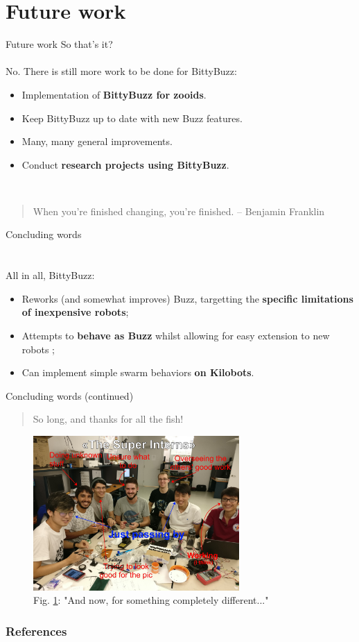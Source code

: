 \documentclass{beamer}
\begin{document}
	\section{Future work}
	\begin{frame}{Future work}
		So that's it?\\
		~\\
		No. There is still more work to be done for BittyBuzz:
		\begin{itemize}
			\item Implementation of \textbf{BittyBuzz for zooids}.
			\item Keep BittyBuzz up to date with new Buzz features.
			\item Many, many general improvements.
			\item Conduct \textbf{research projects using BittyBuzz}.
		\end{itemize}
		~\\
		\begin{quote}
			When you're finished changing, you're finished. -- Benjamin Franklin
		\end{quote}
	\end{frame}
	\begin{frame}{Concluding words}
		\section{}
		All in all, BittyBuzz:
		\begin{itemize}
			\item Reworks (and somewhat improves) Buzz, targetting the \textbf{specific limitations of inexpensive robots};
			\item Attempts to \textbf{behave as Buzz} whilst allowing for easy extension to new robots ;
			\item Can implement simple swarm behaviors \textbf{on Kilobots}.
		\end{itemize}
	\end{frame}
	\begin{frame}{Concluding words (continued)}
		\begin{quote}
			So long, and thanks for all the fish!
		\end{quote}
		\begin{figure}
			\includegraphics[width=0.7\textwidth]{the_great_interns}
			\caption{\label{figure:The Great Interns}Fig. \ref{figure:The Great Interns}: "And now, for something completely different..."}
		\end{figure}
	\end{frame}
	\begin{frame}[allowframebreaks]
		\frametitle{References}
		
		
	\end{frame}
\end{document}
